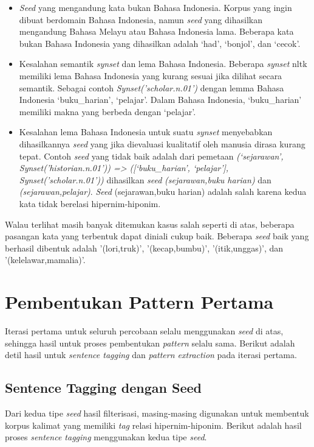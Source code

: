 \begin{itemize}
  \item \textit{Seed} yang mengandung kata bukan Bahasa Indonesia. Korpus yang ingin dibuat berdomain Bahasa Indonesia, namun \textit{seed} yang dihasilkan mengandung Bahasa Melayu atau Bahasa Indonesia lama. Beberapa kata bukan Bahasa Indonesia yang dihasilkan adalah `had', `bonjol', dan `cecok'.
  \item Kesalahan semantik \textit{synset} dan lema Bahasa Indonesia. Beberapa \textit{synset} nltk memiliki lema Bahasa Indonesia yang kurang sesuai jika dilihat secara semantik. Sebagai contoh \textit{Synset('scholar.n.01')} dengan lemma Bahasa Indonesia `buku\_harian', `pelajar'. Dalam Bahasa Indonesia, `buku\_harian' memiliki makna yang berbeda dengan `pelajar'.
  \item Kesalahan lema Bahasa Indonesia untuk suatu \textit{synset} menyebabkan dihasilkannya \textit{seed} yang jika dievaluasi kualitatif oleh manusia dirasa kurang tepat. Contoh \textit{seed} yang tidak baik adalah dari pemetaan \textit{(`sejarawan', Synset('historian.n.01')) => ([`buku\_harian', `pelajar'], Synset('scholar.n.01'))} dihasilkan \textit{seed} \textit{(sejarawan,buku harian)} dan \textit{(sejarawan,pelajar)}. \textit{Seed} (sejarawan,buku harian) adalah salah karena kedua kata tidak berelasi hipernim-hiponim. 
\end{itemize}

Walau terlihat masih banyak ditemukan kasus salah seperti di atas, beberapa pasangan kata yang terbentuk dapat diniali cukup baik. Beberapa \textit{seed} baik yang berhasil dibentuk adalah '(lori,truk)', '(kecap,bumbu)', '(itik,unggas)', dan '(kelelawar,mamalia)'.

\section{Pembentukan Pattern Pertama}
Iterasi pertama untuk seluruh percobaan selalu menggunakan \textit{seed} di atas, sehingga hasil untuk proses pembentukan \textit{pattern} selalu sama. Berikut adalah detil hasil untuk \textit{sentence tagging} dan \textit{pattern extraction} pada iterasi pertama.

\subsection{Sentence Tagging dengan Seed}
Dari kedua tipe \textit{seed} hasil filterisasi, masing-masing digunakan untuk membentuk korpus kalimat yang memiliki \textit{tag} relasi hipernim-hiponim. Berikut adalah hasil proses \textit{sentence tagging} menggunakan kedua tipe \textit{seed}.

